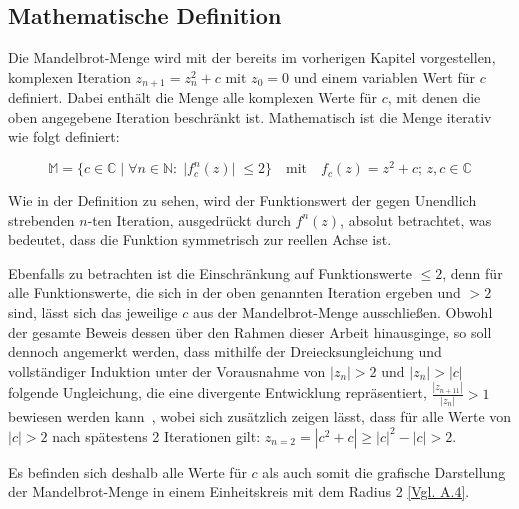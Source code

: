 \subsection{Mathematische Definition}\label{subsec:mathematical-definition}

Die Mandelbrot-Menge wird mit der bereits im vorherigen Kapitel vorgestellen,
komplexen Iteration $z_{n+1} = z_n^2 + c \text{ mit } z_0 = 0$ und einem variablen
Wert für $c$~\cite*[S.25]{schuh_fraktale_2017} definiert.
Dabei enthält die Menge alle komplexen Werte für $c$, mit denen die
oben angegebene Iteration beschränkt ist.
Mathematisch ist die Menge iterativ wie folgt definiert:

\begin{equation}\label{eq:mathematical-definition}
  \mathbb{M} = \{c \in \mathbb{C} \; |\;  \forall n \in \mathbb{N}:\; |f_c^n(z)|\; \leqslant 2\}
  \quad
  \text{mit}
  \quad
  f_c(z) = z^2 + c;\, z,c \in \mathbb{C}
\end{equation}

Wie in der Definition zu sehen, wird der Funktionswert der
gegen Unendlich strebenden $n$-ten Iteration, ausgedrückt durch $f^n(z)$,
absolut betrachtet, was bedeutet, dass die Funktion symmetrisch zur reellen Achse ist.

Ebenfalls zu betrachten ist die Einschränkung auf Funktionswerte $\leqslant 2$, denn
für alle Funktionswerte, die sich in der oben genannten Iteration ergeben
und $> 2$ sind, lässt sich das jeweilige $c$ aus der Mandelbrot-Menge
ausschließen.
Obwohl der gesamte Beweis dessen über den Rahmen dieser Arbeit hinausginge,
so soll dennoch angemerkt werden, dass mithilfe der Dreiecksungleichung und
vollständiger Induktion unter der Vorausnahme von $|z_n| > 2 \text{ und } |z_n| > |c|$
folgende Ungleichung, die eine divergente Entwicklung repräsentiert,
$\frac{|z_{n+11}|}{|z_n|} > 1$ bewiesen werden kann~\cite{munafo_escape_1997},
wobei sich zusätzlich zeigen lässt, dass für alle Werte von $|c| > 2$
nach spätestens 2 Iterationen gilt: $z_{n=2} = |c^2 + c| \geqslant |c|^2 - |c| > 2$.

Es befinden sich deshalb alle Werte für $c$ als auch somit die grafische Darstellung
der Mandelbrot-Menge in einem Einheitskreis mit dem Radius 2 \hyperref[app:4]{[Vgl. A.4]}.